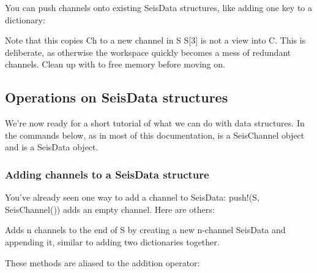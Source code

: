 \documentclass[letterpaper,11pt,english]{sphinxmanual}
\begin{document}
You can push channels onto existing SeisData structures, like adding one key
to a dictionary:


\begin{fulllineitems}
\end{fulllineitems}


Note that this copies Ch to a new channel in S \textendash{} S{[}3{]} is not a view into C.
This is deliberate, as otherwise the workspace quickly becomes a mess of
redundant channels. Clean up with  to free memory before moving on.


\subsection{Operations on SeisData structures}
\label{\detokenize{src/working_with_data:operations-on-seisdata-structures}}
We’re now ready for a short tutorial of what we can do with data structures.
In the commands below, as in most of this documentation,  is a
SeisChannel object and  is a SeisData object.


\subsubsection{Adding channels to a SeisData structure}
\label{\detokenize{src/working_with_data:adding-channels-to-a-seisdata-structure}}
You’ve already seen one way to add a channel to SeisData: push!(S, SeisChannel())
adds an empty channel. Here are others:


\begin{fulllineitems}
\end{fulllineitems}


Adds n channels to the end of S by creating a new n-channel SeisData and
appending it, similar to adding two dictionaries together.

These methods are aliased to the addition operator:

%
\begin{sphinxVerbatim}[commandchars=\\\{\}]
        
      
   
       
      \PYG{p}{[}    \PYG{p}{]}
\end{sphinxVerbatim}
\end{document}

